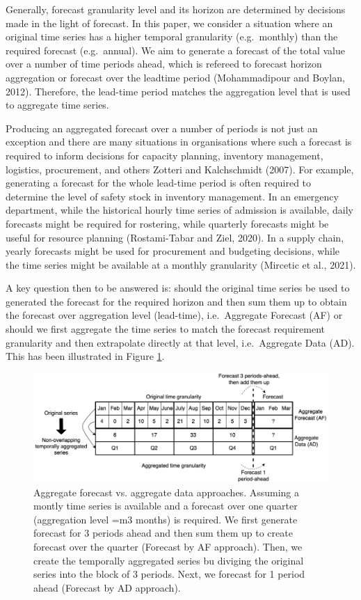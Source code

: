 \documentclass[]{elsarticle} %
\begin{document}
Generally, forecast granularity level and its horizon are determined by
decisions made in the light of forecast. In this paper, we consider a
situation where an original time series has a higher temporal
granularity (e.g.~monthly) than the required forecast (e.g.~annual). We
aim to generate a forecast of the total value over a number of time
periods ahead, which is refereed to forecast horizon aggregation or
forecast over the leadtime period (Mohammadipour and Boylan, 2012).
Therefore, the lead-time period matches the aggregation level that is
used to aggregate time series.

Producing an aggregated forecast over a number of periods is not just an
exception and there are many situations in organisations where such a
forecast is required to inform decisions for capacity planning,
inventory management, logistics, procurement, and others Zotteri and
Kalchschmidt (2007). For example, generating a forecast for the whole
lead-time period is often required to determine the level of safety
stock in inventory management. In an emergency department, while the
historical hourly time series of admission is available, daily forecasts
might be required for rostering, while quarterly forecasts might be
useful for resource planning (Rostami-Tabar and Ziel, 2020). In a supply
chain, yearly forecasts might be used for procurement and budgeting
decisions, while the time series might be available at a monthly
granularity (Mircetic et al., 2021).

A key question then to be answered is: should the original time series
be used to generated the forecast for the required horizon and then sum
them up to obtain the forecast over aggregation level (lead-time),
i.e.~Aggregate Forecast (AF) or should we first aggregate the time
series to match the forecast requirement granularity and then
extrapolate directly at that level, i.e.~Aggregate Data (AD). This has
been illustrated in Figure \ref{fig:example_oanoa}.

\begin{figure}[H]
\includegraphics[width=0.9\linewidth]{img/300dpi/nota} \caption{Aggregate forecast vs. aggregate data approaches. Assuming a montly time series is available and a forecast over one quarter (aggregation level =m3 months) is required. We first generate forecast for 3 periods ahead and then sum them up to create forecast over the quarter (Forecast by AF approach). Then, we create the temporally aggregated series bu diviging the original series into the block of 3 periods. Next, we forecast for 1 period ahead (Forecast by AD approach).}\label{fig:example_oanoa}
\end{figure}
\end{document}
